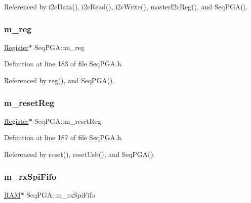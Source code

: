 Referenced by i2c\+Data(), i2c\+Read(), i2c\+Write(), master\+I2c\+Reg(), and Seq\+P\+G\+A().

\mbox{\label{classSeqPGA_afd827f1d3d55b0a8efafbd79a8c54a52}} 
\subsubsection{\texorpdfstring{m\+\_\+reg}{m\_reg}}
{\footnotesize\ttfamily \hyperlink{classRegister}{Register}$\ast$ Seq\+P\+G\+A\+::m\+\_\+reg\hspace{0.3cm}{\ttfamily [private]}}



Definition at line 183 of file Seq\+P\+G\+A.\+h.



Referenced by reg(), and Seq\+P\+G\+A().

\mbox{\label{classSeqPGA_a8c519e98b992ab872622e95dae4461d8}} 
\subsubsection{\texorpdfstring{m\+\_\+reset\+Reg}{m\_resetReg}}
{\footnotesize\ttfamily \hyperlink{classRegister}{Register}$\ast$ Seq\+P\+G\+A\+::m\+\_\+reset\+Reg\hspace{0.3cm}{\ttfamily [private]}}



Definition at line 187 of file Seq\+P\+G\+A.\+h.



Referenced by reset(), reset\+Usb(), and Seq\+P\+G\+A().

\mbox{\label{classSeqPGA_a8ebfe7863e10ab540b5ebecb7655a0d5}} 
\subsubsection{\texorpdfstring{m\+\_\+rx\+Spi\+Fifo}{m\_rxSpiFifo}}
{\footnotesize\ttfamily \hyperlink{classRAM}{R\+AM}$\ast$ Seq\+P\+G\+A\+::m\+\_\+rx\+Spi\+Fifo\hspace{0.3cm}{\ttfamily [private]}}



